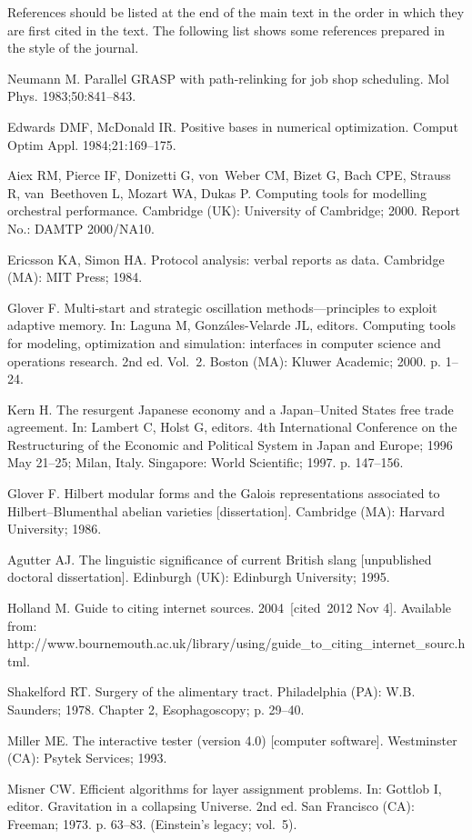\documentclass{gAPA2e}
\theoremstyle{plain}
\theoremstyle{remark}
\theoremstyle{definition}
\begin{document}
References should be listed at the end of the main text in the order in which they are first cited in the text. The following list shows some references prepared in the style of the journal.

\begin{thebibliography}{12}

Neumann M. Parallel GRASP with path-relinking for job shop scheduling. Mol
  Phys. 1983;50:841--843.

Edwards DMF, McDonald IR. Positive bases in numerical optimization. Comput
  Optim Appl. 1984;21:169--175.

Aiex RM, Pierce IF, Donizetti G, von~Weber CM, Bizet G, Bach CPE, Strauss
  R, van~Beethoven L, Mozart WA, Dukas P. Computing tools for modelling
  orchestral performance. Cambridge (UK): University of Cambridge; 2000.
  Report No.: DAMTP 2000/NA10.

Ericsson KA, Simon HA. Protocol analysis: verbal reports as data. Cambridge
  (MA): MIT Press; 1984.

Glover F. Multi-start and strategic oscillation methods---principles to exploit
  adaptive memory. In: Laguna M, Gonz\'{a}les-Velarde JL, editors. Computing
  tools for modeling, optimization and simulation: interfaces in computer
  science and operations research. 2nd ed. Vol.~2. Boston (MA): Kluwer Academic;
  2000. p. 1--24.

Kern H. The resurgent Japanese economy and a Japan--United States free
  trade agreement. In: Lambert C, Holst G, editors. 4th International
  Conference on the Restructuring of the Economic and Political System in Japan
  and Europe; 1996 May 21--25; Milan, Italy. Singapore: World Scientific;
  1997. p. 147--156.

Glover F. Hilbert modular forms and the Galois representations associated to
  Hilbert--Blumenthal abelian varieties [dissertation]. Cambridge (MA): Harvard
  University; 1986.

Agutter AJ. The linguistic significance of current British slang [unpublished
  doctoral dissertation]. Edinburgh (UK): Edinburgh University; 1995.

Holland M. Guide to citing internet sources. 2004~[cited~2012 Nov 4].
  Available from: http://www.bournemouth.ac.uk/library/using/guide\_to\_citing\_internet\_sourc.html.

Shakelford RT. Surgery of the alimentary tract. Philadelphia (PA): W.B.
Saunders; 1978. Chapter 2, Esophagoscopy; p. 29--40.

Miller ME. The interactive tester (version 4.0) [computer software].
  Westminster (CA): Psytek Services; 1993.

Misner CW. Efficient algorithms for layer assignment problems. In: Gottlob I,
  editor. Gravitation in a collapsing Universe. 2nd ed. San Francisco (CA):
  Freeman; 1973. p. 63--83. (Einstein's legacy; vol.~5).

\end{thebibliography}
\end{document}
